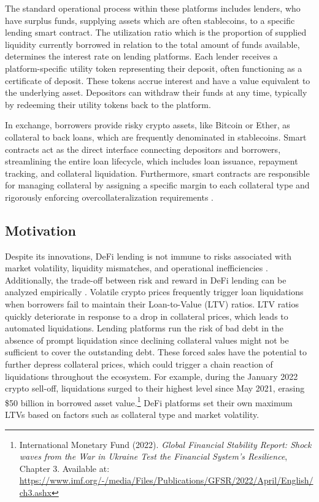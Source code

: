 \documentclass[11pt]{article} %
\begin{document}
The standard operational process within these platforms includes lenders, who have surplus funds, supplying assets which are often stablecoins, to a specific lending smart contract. The utilization ratio which is the proportion of supplied liquidity currently borrowed in relation to the total amount of funds available, determines the interest rate on lending platforms. Each lender receives a platform-specific utility token representing their deposit, often functioning as a certificate of deposit. These tokens accrue interest and have a value equivalent to the underlying asset. Depositors can withdraw their funds at any time, typically by redeeming their utility tokens back to the platform.

In exchange, borrowers provide risky crypto assets, like Bitcoin or Ether, as collateral to back loans, which are frequently denominated in stablecoins. Smart contracts act as the direct interface connecting depositors and borrowers, streamlining the entire loan lifecycle, which includes loan issuance, repayment tracking, and collateral liquidation. Furthermore, smart contracts are responsible for managing collateral by assigning a specific margin to each collateral type and rigorously enforcing overcollateralization requirements \citep{capponi23}.

\subsection{Motivation}\label{sec:intro-motivation}
Despite its innovations, DeFi lending is not immune to risks associated with market volatility, liquidity mismatches, and operational inefficiencies \citep{gudgeon20_1}. Additionally, the trade-off between risk and reward in DeFi lending can be analyzed empirically \citep{lehar22}. Volatile crypto prices frequently trigger loan liquidations when borrowers fail to maintain their Loan-to-Value (LTV) ratios.
LTV ratios quickly deteriorate in response to a drop in collateral prices, which leads to automated liquidations. Lending platforms run the risk of bad debt in the absence of prompt liquidation since declining collateral values might not be sufficient to cover the outstanding debt. These forced sales have the potential to further depress collateral prices, which could trigger a chain reaction of liquidations throughout the ecosystem. 
For example, during the January 2022 crypto sell-off, liquidations surged to their highest level since May 2021, erasing \$50 billion in borrowed asset value.\footnote{International Monetary Fund (2022). \textit{Global Financial Stability Report: Shock waves from the War in Ukraine Test the Financial System’s Resilience}, Chapter 3. Available at: \url{https://www.imf.org/-/media/Files/Publications/GFSR/2022/April/English/ch3.ashx}} DeFi platforms set their own maximum LTVs based on factors such as collateral type and market volatility.
\end{document}
